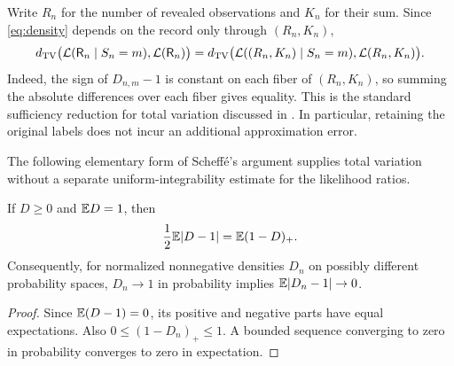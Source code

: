 \begin{remark}
Write $R_n$ for the number of revealed observations and $K_n$ for their sum. Since \eqref{eq:density} depends on the record only through $(R_n,K_n)$,
\[
 d_{\mathrm{TV}}\bigl(\mathcal L(\mathsf R_n\mid S_n=m),\mathcal L(\mathsf R_n)\bigr)
 =d_{\mathrm{TV}}\bigl(\mathcal L((R_n,K_n)\mid S_n=m),\mathcal L(R_n,K_n)\bigr).
\]
Indeed, the sign of $D_{n,m}-1$ is constant on each fiber of $(R_n,K_n)$, so summing the absolute differences over each fiber gives equality. This is the standard sufficiency reduction for total variation discussed in \cite[Theorem~2]{AT}. In particular, retaining the original labels does not incur an additional approximation error.
\end{remark}

The following elementary form of Scheff\'e's argument \cite{Scheffe} supplies total variation without a separate uniform-integrability estimate for the likelihood ratios.
\begin{lemma}\label{lem:l1}
If $D\ge0$ and $\mathbb E D=1$, then
\begin{equation}\label{eq:l1}
 \frac12\mathbb E|D-1|=\mathbb E(1-D)_+.
\end{equation}
Consequently, for normalized nonnegative densities $D_n$ on possibly different probability spaces, $D_n\to1$ in probability implies $\mathbb E|D_n-1|\to0$.
\end{lemma}
\begin{proof}
Since $\mathbb E(D-1)=0$, its positive and negative parts have equal expectations. Also $0\le(1-D_n)_+\le1$. A bounded sequence converging to zero in probability converges to zero in expectation.
\end{proof}

